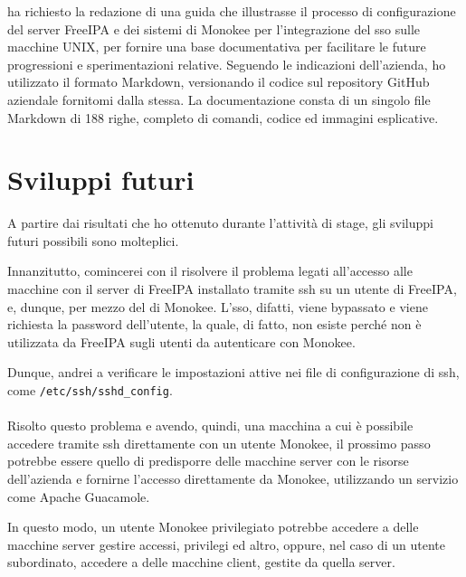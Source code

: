\myAzienda{} ha richiesto la redazione di una guida che illustrasse il processo di configurazione del server FreeIPA e dei sistemi di Monokee per l'integrazione del \acrshort{sso} sulle macchine UNIX, per fornire una base documentativa per facilitare le future progressioni e sperimentazioni relative. Seguendo le indicazioni dell'azienda, ho utilizzato il formato Markdown, versionando il codice sul repository GitHub aziendale fornitomi dalla stessa\cite{site:docs}. La documentazione consta di un singolo file Markdown di 188 righe, completo di comandi, codice ed immagini esplicative.



\section{Sviluppi futuri}
A partire dai risultati che ho ottenuto durante l'attività di stage, gli sviluppi futuri possibili sono molteplici.

Innanzitutto, comincerei con il risolvere il problema legati all'accesso alle macchine con il server di FreeIPA installato tramite \acrshort{ssh} su un utente di FreeIPA, e, dunque, per mezzo del  di Monokee. L'\acrshort{sso}, difatti, viene bypassato e viene richiesta la password dell'utente, la quale, di fatto, non esiste perché non è utilizzata da FreeIPA sugli utenti da autenticare con Monokee. 

Dunque, andrei a verificare le impostazioni attive nei file di configurazione di \acrshort{ssh}, come \texttt{/etc/ssh/sshd\_config}.
\\ \\
Risolto questo problema e avendo, quindi, una macchina a cui è possibile accedere tramite \acrshort{ssh} direttamente con un utente Monokee, il prossimo passo potrebbe essere quello di predisporre delle macchine server con le risorse dell'azienda e fornirne l'accesso 
direttamente da Monokee, utilizzando un servizio come Apache Guacamole.

In questo modo, un utente Monokee privilegiato potrebbe accedere a delle macchine server gestire accessi, privilegi ed altro, oppure, nel caso di un utente subordinato, accedere a delle macchine client, gestite da quella server.